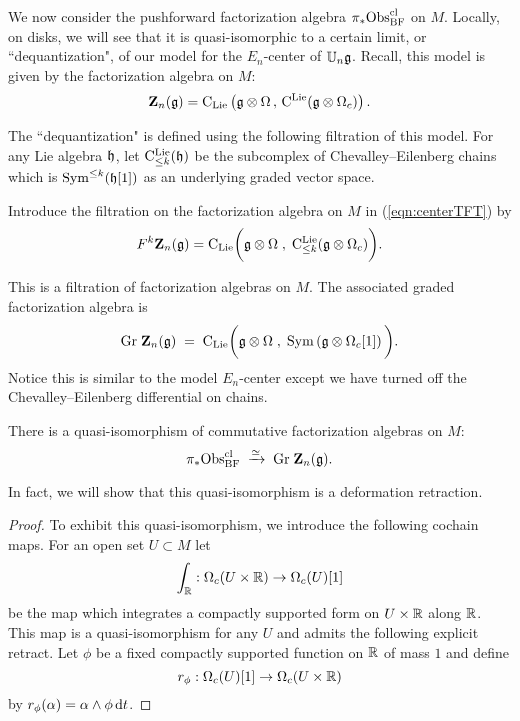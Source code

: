 \documentclass[11pt]{amsart}
\numberwithin{equation}{section}
\begin{document}
We now consider the pushforward factorization algebra $\pi_* {\rm Obs}^{\rm cl}_{\rm BF}$ on $M$.
Locally, on disks, we will see that it is quasi-isomorphic to a certain limit, or ``dequantization", of our model for the $E_n$-center of $\mathbb U_n \mathfrak g$.
Recall, this model is given by the factorization algebra on $M$:
\begin{equation}\label{eqn:centerTFT}
\mathbf Z_n(\mathfrak g) = {\rm C}_{{\rm Lie}}\left(\mathfrak g \otimes \Omega \, , \, {\rm C}^{\rm Lie} (\mathfrak g \otimes \Omega_c) \right) .
\end{equation}

The ``dequantization" is defined using the following filtration of this model.
For any Lie algebra $\mathfrak h$, let ${\rm C}^{\rm Lie}_{\leq k} (\mathfrak h)$ be the subcomplex of Chevalley--Eilenberg chains which is ${\rm Sym}^{\leq k} (\mathfrak h[1])$ as an underlying graded vector space. 

\begin{dfn}
Introduce the filtration on the factorization algebra on $M$ in (\ref{eqn:centerTFT}) by 
\[
F^k \mathbf Z_n(\mathfrak g) = {\rm C}_{{\rm Lie}} \bigg(\mathfrak g \otimes \Omega \; , \; {\rm C}^{\rm Lie}_{\leq k} (\mathfrak g \otimes \Omega_c) \bigg) .
\]
\end{dfn}

This is a filtration of factorization algebras on $M$. 
The associated graded factorization algebra is
\[
{\rm Gr} \; \mathbf Z_n(\mathfrak g) \; = \; {\rm C}_{{\rm Lie}} \bigg(\mathfrak g \otimes \Omega \; , \; {\rm Sym} \left(\mathfrak g \otimes \Omega_c [1] \right) \bigg) .
\]
Notice this is similar to the model $E_n$-center except we have turned off the Chevalley--Eilenberg differential on chains. 

 \begin{lmm}
There is a quasi-isomorphism of commutative factorization algebras on $M$:
\[
\pi_* {\rm Obs}^{\rm cl}_{\rm BF} \; \xrightarrow{\simeq} \; {\rm Gr} \; \mathbf Z_n(\mathfrak g) .
\]
\end{lmm}

In fact, we will show that this quasi-isomorphism is a deformation retraction. 

\begin{proof}
To exhibit this quasi-isomorphism, we introduce the following cochain maps.
For an open set $U \subset M$ let
\[
\int_\mathbb R : \Omega_c(U \times \mathbb R) \to \Omega_c (U) [1] 
\] 
be the map which integrates a compactly supported form on $U \times \mathbb R$ along $\mathbb R$. 
This map is a quasi-isomorphism for any $U $ and admits the following explicit retract. 
Let $\phi$ be a fixed compactly supported function on $\mathbb R$ of mass $1$ and define
\[
r_\phi : \Omega_c(U) [1] \to \Omega_c (U \times \mathbb R)
\]
by $r_\phi (\alpha) = \alpha \wedge \phi \, {\rm d} t$. 
\end{proof}
\end{document}
